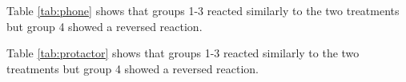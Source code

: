 \documentclass[idxtotoc,hyperref,openany]{labbook} %
\begin{document}
Table \ref{tab:phone} shows that groups 1-3 reacted similarly to the two treatments but group 4 showed a reversed reaction.

\begin{table}[H]
\caption{Phone measurements on tracks.}
\label{tab:protactor}
\end{table}

Table \ref{tab:protactor} shows that groups 1-3 reacted similarly to the two treatments but group 4 showed a reversed reaction.










\end{document}
